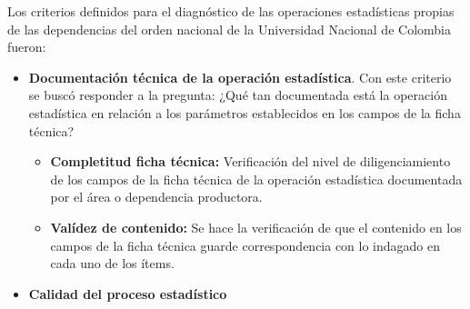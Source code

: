 \documentclass[
]{book}
\begin{document}
Los criterios definidos para el diagnóstico de las operaciones estadísticas propias de las dependencias
del orden nacional de la Universidad Nacional de Colombia fueron:

\begin{itemize}
\item
  \textbf{Documentación técnica de la operación estadística}. Con este criterio se buscó responder a la pregunta: ¿Qué tan documentada está la operación estadística en relación a los parámetros
  establecidos en los campos de la ficha técnica?

  \begin{itemize}
  \item
    \textbf{Completitud ficha técnica:} Verificación del nivel de diligenciamiento de los campos de la ficha
    técnica de la operación estadística documentada por
    el área o dependencia productora.
  \item
    \textbf{Valídez de contenido:} Se hace la verificación de que el contenido en los campos de la ficha
    técnica guarde correspondencia con lo indagado en
    cada uno de los ítems.
  \end{itemize}
\item
  \textbf{Calidad del proceso estadístico}


\end{itemize}
\end{document}
